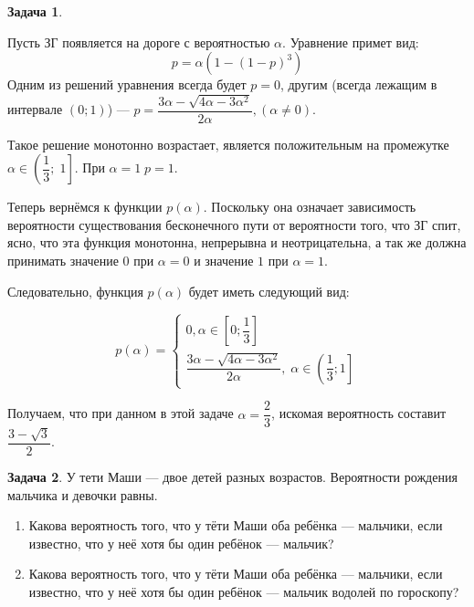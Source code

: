 \documentclass[nobib]{tufte-handout}
\theoremstyle{definition}
\newtheorem{problem}{Задача}
\begin{document}
\begin{problem}
\begin{sol}
Пусть ЗГ появляется на дороге с вероятностью $\alpha$. Уравнение примет вид:
\[
p = \alpha\left(1 - (1-p)^3\right)
\]
Одним из решений уравнения всегда будет $p=0$, другим (всегда лежащим в интервале $(0;1)$) — $p=\dfrac{3\alpha - \sqrt{4\alpha-3\alpha^2}}{2\alpha},(\alpha\neq0)$.

Такое решение монотонно возрастает, является положительным на промежутке $\alpha \in \left(\dfrac{1}{3};\; 1\right]$. При $\alpha=1 \; p = 1$.

Теперь вернёмся к функции $p(\alpha)$. Поскольку она означает зависимость вероятности существования бесконечного пути от вероятности того, что ЗГ спит, ясно, что эта функция монотонна, непрерывна и неотрицательна, а так же должна принимать значение $0$ при $\alpha=0$ и значение $1$ при $\alpha=1$.

Следовательно, функция $p(\alpha)$ будет иметь следующий вид:

\[
p(\alpha)=\begin{cases}
0,\alpha \in \left[0; \dfrac{1}{3}\right]\\
\dfrac{3\alpha - \sqrt{4\alpha-3\alpha^2}}{2\alpha}, \; \alpha \in \left(\dfrac13;1\right]
\end{cases}
\]

Получаем, что при данном в этой задаче $\alpha=\dfrac23$, искомая вероятность составит $\dfrac{3 - \sqrt{3}}{2}$.
\end{sol}
\end{problem}

\begin{problem}
У тети Маши — двое детей разных возрастов. Вероятности рождения мальчика и девочки равны.

\begin{enumerate}
\item Какова вероятность того, что у тёти Маши оба ребёнка — мальчики, если известно, что у неё хотя бы один ребёнок — мальчик?
\item Какова вероятность того, что у тёти Маши оба ребёнка — мальчики, если известно, что у неё хотя бы один ребёнок — мальчик водолей по гороскопу?
\end{enumerate}

\end{problem}
\end{document}

